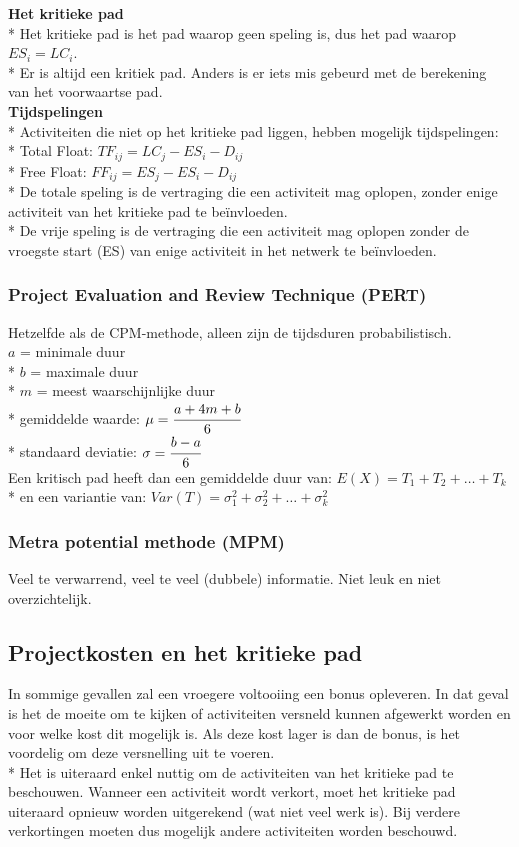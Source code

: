 \documentclass[12pt]{article}
\begin{document}
\textbf{Het kritieke pad}\\*
Het kritieke pad is het pad waarop geen speling is, dus het pad waarop $ES_i = LC_i$.\\*
Er is altijd een kritiek pad. Anders is er iets mis gebeurd met de berekening van het voorwaartse pad.\\
\textbf{Tijdspelingen}\\*
Activiteiten die niet op het kritieke pad liggen, hebben mogelijk tijdspelingen:\\*
Total Float: $TF_{ij} = LC_j - ES_i - D_{ij}$\\*
Free Float: $FF_{ij} = ES_j - ES_i - D_{ij}$\\*
De totale speling is de vertraging die een activiteit mag oplopen, zonder enige activiteit van het kritieke pad te be\"invloeden.\\*
De vrije speling is de vertraging die een activiteit mag oplopen zonder de vroegste start (ES) van enige activiteit in het netwerk te be\"invloeden.
\subsubsection{Project Evaluation and Review Technique (PERT)}
Hetzelfde als de CPM-methode, alleen zijn de tijdsduren probabilistisch.\\
$a$ = minimale duur\\*
$b$ = maximale duur\\*
$m$ = meest waarschijnlijke duur\\*
gemiddelde waarde: $\mu = \cfrac{a + 4m + b}{6}$\\*
standaard deviatie: $\sigma = \cfrac{b-a}{6}$\\
Een kritisch pad heeft dan een gemiddelde duur van: $E(X) = T_1 + T_2 + \dots + T_k$\\*
en een variantie van: $Var(T) = \sigma_1^2 + \sigma_2^2 + \dots + \sigma_k^2$
\subsubsection{Metra potential methode (MPM)}
Veel te verwarrend, veel te veel (dubbele) informatie. Niet leuk en niet overzichtelijk.
\subsection{Projectkosten en het kritieke pad}
In sommige gevallen zal een vroegere voltooiing een bonus opleveren. In dat geval is het de moeite om te kijken of activiteiten versneld kunnen afgewerkt worden en voor welke kost dit mogelijk is. Als deze kost lager is dan de bonus, is het voordelig om deze versnelling uit te voeren.\\*
Het is uiteraard enkel nuttig om de activiteiten van het kritieke pad te beschouwen. Wanneer een activiteit wordt verkort, moet het kritieke pad uiteraard opnieuw worden uitgerekend (wat niet veel werk is). Bij verdere verkortingen moeten dus mogelijk andere activiteiten worden beschouwd.
\end{document}

